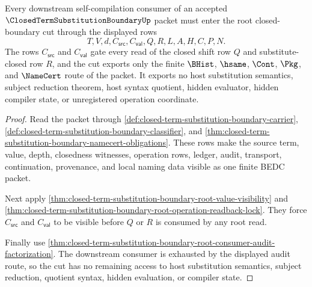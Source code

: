 \begin{theorem}
\label{thm:closed-term-substitution-boundary-root-closed-boundary-cut}
Every downstream self-compilation consumer of an accepted $\ClosedTermSubstitutionBoundaryUp$ packet must enter the root closed-boundary cut through the displayed rows
$$
T,V,d,C_{\mathsf{src}},C_{\mathsf{val}},Q,R,L,A,H,C,P,N.
$$
The rows $C_{\mathsf{src}}$ and $C_{\mathsf{val}}$ gate every read of the closed shift row $Q$ and substitute-closed row $R$, and the cut exports only the finite $\BHist$, $\hsame$, $\Cont$, $\Pkg$, and $\NameCert$ route of the packet. It exports no host substitution semantics, subject reduction theorem, host syntax quotient, hidden evaluator, hidden compiler state, or unregistered operation coordinate.
\end{theorem}
\begin{proof}
Read the packet through \autoref{def:closed-term-substitution-boundary-carrier}, \autoref{def:closed-term-substitution-boundary-classifier}, and \autoref{thm:closed-term-substitution-boundary-namecert-obligations}. These rows make the source term, value, depth, closedness witnesses, operation rows, ledger, audit, transport, continuation, provenance, and local naming data visible as one finite BEDC packet.

Next apply \autoref{thm:closed-term-substitution-boundary-root-value-visibility} and \autoref{thm:closed-term-substitution-boundary-root-operation-readback-lock}. They force $C_{\mathsf{src}}$ and $C_{\mathsf{val}}$ to be visible before $Q$ or $R$ is consumed by any root read.

Finally use \autoref{thm:closed-term-substitution-boundary-root-consumer-audit-factorization}. The downstream consumer is exhausted by the displayed audit route, so the cut has no remaining access to host substitution semantics, subject reduction, quotient syntax, hidden evaluation, or compiler state.
\end{proof}

